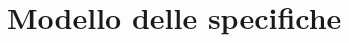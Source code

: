 \documentclass[a4paper, 12pt]{article}
\begin{document}
\section{Modello delle specifiche}
%
%
%
\end{document}
